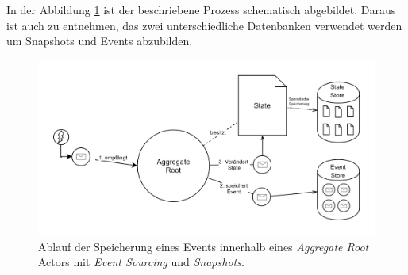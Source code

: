 In der Abbildung \ref{fig:implementation:eventSourcingAggregateRoot} ist der beschriebene Prozess schematisch abgebildet. Daraus ist auch zu entnehmen, das zwei unterschiedliche Datenbanken verwendet werden um Snapshots und Events abzubilden.
\begin{figure}
    \centering
    \includegraphics[width=\linewidth]{gfx/implementation/EventSourcingAkka}
    \caption{Ablauf der Speicherung eines Events innerhalb eines \textit{Aggregate Root} Actors mit \textit{Event Sourcing} und \textit{Snapshots}.}
    \label{fig:implementation:eventSourcingAggregateRoot}
\end{figure} 

